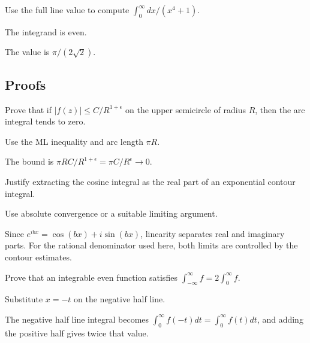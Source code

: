 \begin{exercise}\label{exr:iv11-expand-05}
Use the full line value to compute \(\int_0^\infty dx/(x^4+1)\).
\end{exercise}
\begin{hint}
The integrand is even.
\end{hint}
\begin{solution}
The value is \(\pi/(2\sqrt2)\).
\end{solution}

\subsection*{Proofs}

\begin{exercise}\label{exr:iv11-expand-06}
Prove that if \(|f(z)|\le C/R^{1+\epsilon}\) on the upper semicircle of radius \(R\), then the arc integral tends to zero.
\end{exercise}
\begin{hint}
Use the ML inequality and arc length \(\pi R\).
\end{hint}
\begin{solution}
The bound is \(\pi R C/R^{1+\epsilon}=\pi C/R^\epsilon\to0\).
\end{solution}

\begin{exercise}\label{exr:iv11-expand-07}
Justify extracting the cosine integral as the real part of an exponential contour integral.
\end{exercise}
\begin{hint}
Use absolute convergence or a suitable limiting argument.
\end{hint}
\begin{solution}
Since \(e^{ibx}=\cos(bx)+i\sin(bx)\), linearity separates real and imaginary parts. For the rational denominator used here, both limits are controlled by the contour estimates.
\end{solution}

\begin{exercise}\label{exr:iv11-expand-08}
Prove that an integrable even function satisfies \(\int_{-\infty}^{\infty}f=2\int_0^\infty f\).
\end{exercise}
\begin{hint}
Substitute \(x=-t\) on the negative half line.
\end{hint}
\begin{solution}
The negative half line integral becomes \(\int_0^\infty f(-t)dt=\int_0^\infty f(t)dt\), and adding the positive half gives twice that value.
\end{solution}

